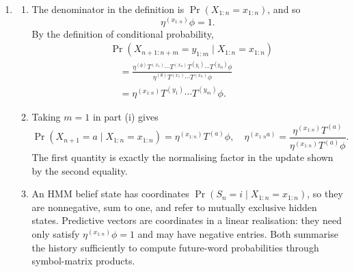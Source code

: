 \begin{solution}[ex:p3-4]
\begin{enumerate}
      \item
        \begin{enumerate}
          \item The denominator in the definition is
            $\Pr(X_{1:n}=x_{1:n})$, and so
            \[
              \eta^{(x_{1:n})}\phi=1.
            \]
            By the definition of conditional probability,
            \[
              \begin{aligned}
                &\Pr(X_{n+1:n+m}=y_{1:m}\mid X_{1:n}=x_{1:n})\\
                &\quad=
                  \frac{\eta^{(\emptyset)}
                    T^{(x_1)}\cdots T^{(x_n)}
                    T^{(y_1)}\cdots T^{(y_m)}\phi}
                  {\eta^{(\emptyset)}
                    T^{(x_1)}\cdots T^{(x_n)}\phi}\\
                &\quad=
                  \eta^{(x_{1:n})}
                    T^{(y_1)}\cdots T^{(y_m)}\phi.
              \end{aligned}
            \]

          \item Taking $m=1$ in part (i) gives
            \[
              \Pr(X_{n+1}=a\mid X_{1:n}=x_{1:n})
                =\eta^{(x_{1:n})}T^{(a)}\phi,
              \quad
              \eta^{(x_{1:n}a)}
                =\frac{\eta^{(x_{1:n})}T^{(a)}}
                  {\eta^{(x_{1:n})}T^{(a)}\phi}.
            \]
            The first quantity is exactly the normalising factor in the
            update shown by the second equality.

          \item An HMM belief state has coordinates
            $\Pr(S_n=i\mid X_{1:n}=x_{1:n})$, so they are nonnegative, sum to
            one, and refer to mutually exclusive hidden states. Predictive
            vectors are coordinates in a linear realisation: they need only
            satisfy $\eta^{(x_{1:n})}\phi=1$ and may have negative entries.
            Both summarise the history sufficiently to compute future-word
            probabilities through symbol-matrix products.
        \end{enumerate}


\end{enumerate}
\end{solution}
